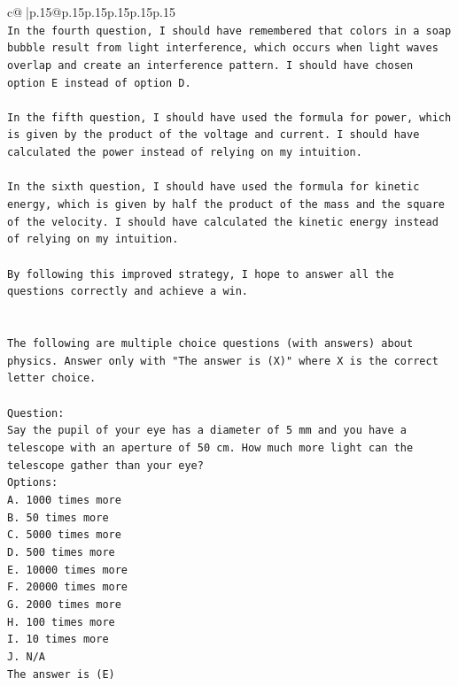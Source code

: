 \documentclass{article}
\begin{document}
{\begin{supertabular}{c@{$\;$}|p{.15\linewidth}@{}p{.15\linewidth}p{.15\linewidth}p{.15\linewidth}p{.15\linewidth}p{.15\linewidth}}
{{{\\ 
\texttt{In the fourth question, I should have remembered that colors in a soap bubble result from light interference, which occurs when light waves overlap and create an interference pattern. I should have chosen option E instead of option D.} \\
\\ 
\texttt{In the fifth question, I should have used the formula for power, which is given by the product of the voltage and current. I should have calculated the power instead of relying on my intuition.} \\
\\ 
\texttt{In the sixth question, I should have used the formula for kinetic energy, which is given by half the product of the mass and the square of the velocity. I should have calculated the kinetic energy instead of relying on my intuition.} \\
\\ 
\texttt{By following this improved strategy, I hope to answer all the questions correctly and achieve a win.} \\
\\ 
\\ 
\texttt{The following are multiple choice questions (with answers) about physics. Answer only with "The answer is (X)" where X is the correct letter choice.} \\
\\ 
\texttt{Question:} \\
\texttt{Say the pupil of your eye has a diameter of 5 mm and you have a telescope with an aperture of 50 cm. How much more light can the telescope gather than your eye?} \\
\texttt{Options:} \\
\texttt{A. 1000 times more} \\
\texttt{B. 50 times more} \\
\texttt{C. 5000 times more} \\
\texttt{D. 500 times more} \\
\texttt{E. 10000 times more} \\
\texttt{F. 20000 times more} \\
\texttt{G. 2000 times more} \\
\texttt{H. 100 times more} \\
\texttt{I. 10 times more} \\
\texttt{J. N/A} \\
\texttt{The answer is (E)} \\
\\ 
}}}
\end{supertabular}}
\end{document}
